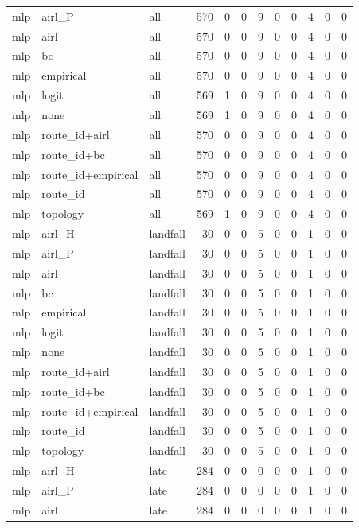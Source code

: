 \begin{tabular}{lllrrrrrrrrr}
mlp & airl_P & all & 570 & 0 & 0 & 9 & 0 & 0 & 4 & 0 & 0 \\
mlp & airl & all & 570 & 0 & 0 & 9 & 0 & 0 & 4 & 0 & 0 \\
mlp & bc & all & 570 & 0 & 0 & 9 & 0 & 0 & 4 & 0 & 0 \\
mlp & empirical & all & 570 & 0 & 0 & 9 & 0 & 0 & 4 & 0 & 0 \\
mlp & logit & all & 569 & 1 & 0 & 9 & 0 & 0 & 4 & 0 & 0 \\
mlp & none & all & 569 & 1 & 0 & 9 & 0 & 0 & 4 & 0 & 0 \\
mlp & route_id+airl & all & 570 & 0 & 0 & 9 & 0 & 0 & 4 & 0 & 0 \\
mlp & route_id+bc & all & 570 & 0 & 0 & 9 & 0 & 0 & 4 & 0 & 0 \\
mlp & route_id+empirical & all & 570 & 0 & 0 & 9 & 0 & 0 & 4 & 0 & 0 \\
mlp & route_id & all & 570 & 0 & 0 & 9 & 0 & 0 & 4 & 0 & 0 \\
mlp & topology & all & 569 & 1 & 0 & 9 & 0 & 0 & 4 & 0 & 0 \\
mlp & airl_H & landfall & 30 & 0 & 0 & 5 & 0 & 0 & 1 & 0 & 0 \\
mlp & airl_P & landfall & 30 & 0 & 0 & 5 & 0 & 0 & 1 & 0 & 0 \\
mlp & airl & landfall & 30 & 0 & 0 & 5 & 0 & 0 & 1 & 0 & 0 \\
mlp & bc & landfall & 30 & 0 & 0 & 5 & 0 & 0 & 1 & 0 & 0 \\
mlp & empirical & landfall & 30 & 0 & 0 & 5 & 0 & 0 & 1 & 0 & 0 \\
mlp & logit & landfall & 30 & 0 & 0 & 5 & 0 & 0 & 1 & 0 & 0 \\
mlp & none & landfall & 30 & 0 & 0 & 5 & 0 & 0 & 1 & 0 & 0 \\
mlp & route_id+airl & landfall & 30 & 0 & 0 & 5 & 0 & 0 & 1 & 0 & 0 \\
mlp & route_id+bc & landfall & 30 & 0 & 0 & 5 & 0 & 0 & 1 & 0 & 0 \\
mlp & route_id+empirical & landfall & 30 & 0 & 0 & 5 & 0 & 0 & 1 & 0 & 0 \\
mlp & route_id & landfall & 30 & 0 & 0 & 5 & 0 & 0 & 1 & 0 & 0 \\
mlp & topology & landfall & 30 & 0 & 0 & 5 & 0 & 0 & 1 & 0 & 0 \\
mlp & airl_H & late & 284 & 0 & 0 & 0 & 0 & 0 & 1 & 0 & 0 \\
mlp & airl_P & late & 284 & 0 & 0 & 0 & 0 & 0 & 1 & 0 & 0 \\
mlp & airl & late & 284 & 0 & 0 & 0 & 0 & 0 & 1 & 0 & 0 \\

\end{tabular}
